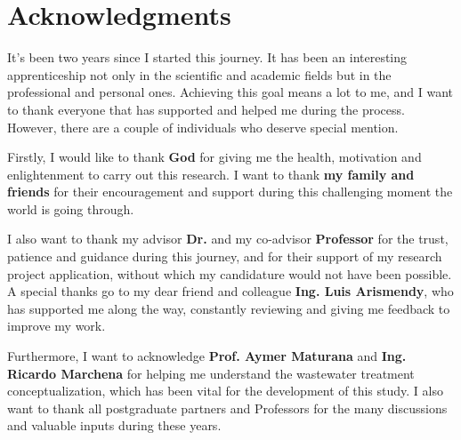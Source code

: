 \chapter*{Acknowledgments}

It’s been two years since I started this journey. It has been an interesting apprenticeship not only in the scientific and academic fields but in the professional and personal ones. Achieving this goal means a lot to me, and I want to thank everyone that has supported and helped me during the process. However, there are a couple of individuals who deserve special mention.

Firstly, I would like to thank \textbf{God} for giving me the health, motivation and enlightenment to carry out this research. I want to thank \textbf{my family and friends} for their encouragement and support during this challenging moment the world is going through.

I also want to thank my advisor \textbf{Dr.} \textbf{\myProfFirstName} \textbf{\myProfLastName} and my co-advisor \textbf{Professor} \textbf{\myOtherProfFirstName} \textbf{\myOtherProfLastName} for the trust, patience and guidance during this journey, and for their support of my research project application, without which my candidature would not have been possible. A special thanks go to my dear friend and colleague \textbf{Ing. Luis Arismendy}, who has supported me along the way, constantly reviewing and giving me feedback to improve my work.

Furthermore, I want to acknowledge \textbf{Prof. Aymer Maturana} and \textbf{Ing. Ricardo Marchena} for helping me understand the wastewater treatment conceptualization, which has been vital for the development of this study. I also want to thank all postgraduate partners and Professors for the many discussions and valuable inputs during these years. 




